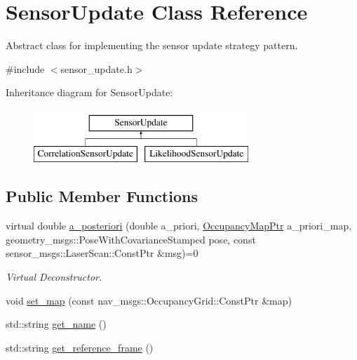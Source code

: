 \hypertarget{classSensorUpdate}{\section{Sensor\-Update Class Reference}
\label{classSensorUpdate}
}


Abstract class for implementing the sensor update strategy pattern.  




{\ttfamily \#include $<$sensor\-\_\-update.\-h$>$}

Inheritance diagram for Sensor\-Update\-:\begin{figure}[H]
\begin{center}
\leavevmode
\includegraphics[height=2.000000cm]{classSensorUpdate}
\end{center}
\end{figure}
\subsection*{Public Member Functions}
\begin{DoxyCompactItemize}
\item 
virtual double \hyperlink{classSensorUpdate_a9bd0792d09b9425b854c6220b6712a52}{a\-\_\-posteriori} (double a\-\_\-priori, \hyperlink{occupancy__map_8h_aea86d1b633e7d9b44b660a39fa9b50f7}{Occupancy\-Map\-Ptr} a\-\_\-priori\-\_\-map, geometry\-\_\-msgs\-::\-Pose\-With\-Covariance\-Stamped pose, const sensor\-\_\-msgs\-::\-Laser\-Scan\-::\-Const\-Ptr \&msg)=0
\begin{DoxyCompactList}\small\item\em Virtual Deconstructor. \end{DoxyCompactList}\item 
void \hyperlink{classSensorUpdate_a01586f280eb8dbad45283696f3301221}{set\-\_\-map} (const nav\-\_\-msgs\-::\-Occupancy\-Grid\-::\-Const\-Ptr \&map)
\item 
std\-::string \hyperlink{classSensorUpdate_a0686226d99e3578bce52920fcb46577b}{get\-\_\-name} ()
\item 
std\-::string \hyperlink{classSensorUpdate_aa7b11255fd04d98eae6d265de84552df}{get\-\_\-reference\-\_\-frame} ()
\end{DoxyCompactItemize}
